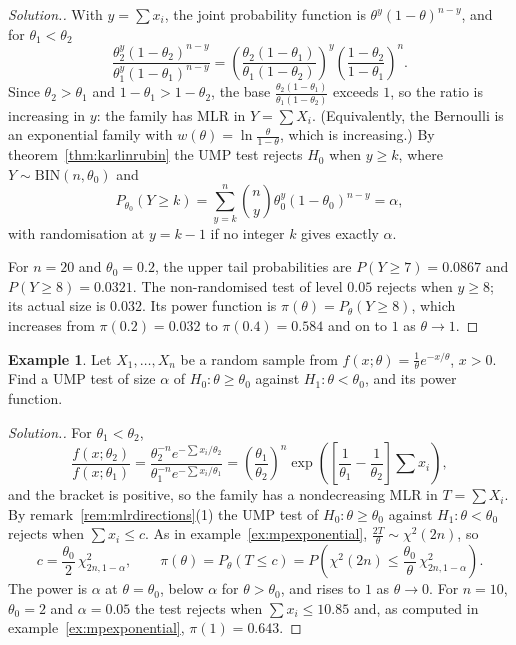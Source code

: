 \documentclass[12pt,a4paper]{report}
\theoremstyle{definition}
\newtheorem{example}[thm]{Example}
\theoremstyle{plain}
\newenvironment{solution}
  {\renewcommand{\qedsymbol}{}\begin{proof}[\textit{Solution}.]}
  {\end{proof}}
\begin{document}
\begin{solution}
With $y = \sum x_i$, the joint probability function is
$\theta^y(1-\theta)^{n-y}$, and for $\theta_1<\theta_2$
\[\frac{\theta_2^y(1-\theta_2)^{n-y}}{\theta_1^y(1-\theta_1)^{n-y}}
= \left(\frac{\theta_2(1-\theta_1)}{\theta_1(1-\theta_2)}\right)^y
\left(\frac{1-\theta_2}{1-\theta_1}\right)^n .\]
Since $\theta_2>\theta_1$ and $1-\theta_1>1-\theta_2$, the base
$\frac{\theta_2(1-\theta_1)}{\theta_1(1-\theta_2)}$ exceeds $1$, so the ratio is
increasing in $y$: the family has MLR in $Y = \sum X_i$. (Equivalently, the Bernoulli
is an exponential family with $w(\theta) = \ln\frac{\theta}{1-\theta}$, which is
increasing.) By theorem~\ref{thm:karlinrubin} the UMP test rejects $H_0$ when
$y\ge k$, where $Y\sim\text{BIN}(n,\theta_0)$ and
\[P_{\theta_0}(Y\ge k) = \sum_{y=k}^n\binom ny\theta_0^y(1-\theta_0)^{n-y} = \alpha ,\]
with randomisation at $y = k-1$ if no integer $k$ gives exactly $\alpha$.

For $n = 20$ and $\theta_0 = 0.2$, the upper tail probabilities are
$P(Y\ge 7) = 0.0867$ and $P(Y\ge 8) = 0.0321$. The non-randomised test of level
$0.05$ rejects when $y\ge 8$; its actual size is $0.032$. Its power function is
$\pi(\theta) = P_\theta(Y\ge 8)$, which increases from $\pi(0.2) = 0.032$ to
$\pi(0.4) = 0.584$ and on to $1$ as $\theta\to1$.
\end{solution}

\begin{example}
\label{ex:umpexponential}
Let $X_1,\dots,X_n$ be a random sample from $f(x;\theta) = \frac1\theta e^{-x/\theta}$,
$x>0$. Find a UMP test of size $\alpha$ of $H_0\colon\theta\ge\theta_0$ against
$H_1\colon\theta<\theta_0$, and its power function.
\end{example}

\begin{solution}
For $\theta_1<\theta_2$,
\[\frac{f(x;\theta_2)}{f(x;\theta_1)}
= \frac{\theta_2^{-n}e^{-\sum x_i/\theta_2}}{\theta_1^{-n}e^{-\sum x_i/\theta_1}}
= \left(\frac{\theta_1}{\theta_2}\right)^n
\exp\left(\left[\frac{1}{\theta_1} - \frac{1}{\theta_2}\right]\sum x_i\right),\]
and the bracket is positive, so the family has a nondecreasing MLR in
$T = \sum X_i$. By remark~\ref{rem:mlrdirections}(1) the UMP test of
$H_0\colon\theta\ge\theta_0$ against $H_1\colon\theta<\theta_0$ rejects when
$\sum x_i\le c$. As in example~\ref{ex:mpexponential}, $\frac{2T}{\theta}\sim\chi^2(2n)$,
so
\[c = \frac{\theta_0}{2}\,\chi^2_{2n,1-\alpha},\qquad
\pi(\theta) = P_\theta(T\le c) = P\left(\chi^2(2n)\le\frac{\theta_0}{\theta}\,\chi^2_{2n,1-\alpha}\right).\]
The power is $\alpha$ at $\theta = \theta_0$, below $\alpha$ for
$\theta>\theta_0$, and rises to $1$ as $\theta\to0$. For $n = 10$, $\theta_0 = 2$
and $\alpha = 0.05$ the test rejects when $\sum x_i\le 10.85$ and, as computed in
example~\ref{ex:mpexponential}, $\pi(1) = 0.643$.
\end{solution}
\end{document}
